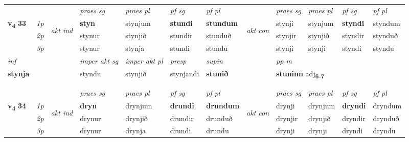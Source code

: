 \begin{longtable}[l]{X>{\footnotesize\itshape}llXXXXlXXXX}
 & &   & \textit{praes sg}  & \textit{praes pl}    & \textit{ pf sg} & \textit{pf pl} & & \textit{praes sg}  & \textit{praes pl}    & \textit{pf sg} & \textit{pf pl }  \\ \cmidrule{4-7} \cmidrule{9-12}
 \multirow{2}{*}{{{\textbf{v{\textsubscript{4}}} \Large{\textbf{33}}}}}  & 1p & \multirow{3}{*}{\begin{turn}{90}\textit{akt ind}\end{turn}} & \textbf{styn} & stynjum & \textbf{stundi} & \textbf{stundum} & \multirow{3}{*}{\begin{turn}{90}\textit{akt con}\end{turn}} &stynji & stynjum & \textbf{styndi} & styndum\\*
 & 2p &  &  stynur  & stynjið & stundir & stunduð & & stynjir & stynjið & styndir & stynduð \\*
 & 3p &  & stynur & stynja & stundi & stundu & & stynji & stynji& styndi & styndu \\*
\cmidrule{4-7} \cmidrule{9-12}

   {\textit{inf}} & &  & \textit{imper akt sg} & \textit{imper akt pl}   & \textit{presp} & \textit{supin}  && \textit{pp m} \\*
  {\textbf{stynja}} & && styndu  & stynjið   & stynjandi &  \textbf{stunið}  && \multicolumn{2}{l}{\textbf{stuninn} adj\textbf{\textsubscript{6-7}}} \\*

\midrule
   & \\*
  & \\
   \midrule
 & &   & \textit{praes sg}  & \textit{praes pl}    & \textit{ pf sg} & \textit{pf pl} & & \textit{praes sg}  & \textit{praes pl}    & \textit{pf sg} & \textit{pf pl }  \\ \cmidrule{4-7} \cmidrule{9-12}
 \multirow{2}{*}{{{\textbf{v{\textsubscript{4}}} \Large{\textbf{34}}}}}  & 1p & \multirow{3}{*}{\begin{turn}{90}\textit{akt ind}\end{turn}} & \textbf{dryn} & drynjum & \textbf{drundi} & \textbf{drundum} & \multirow{3}{*}{\begin{turn}{90}\textit{akt con}\end{turn}} &drynji & drynjum & \textbf{dryndi} & dryndum\\*
 & 2p &  &  drynur  & drynjið & drundir & drunduð & & drynjir & drynjið & dryndir & drynduð \\*
 & 3p &  & drynur & drynja & drundi & drundu & & drynji & drynji& dryndi & dryndu \\*
\cmidrule{4-7} \cmidrule{9-12}


\end{longtable}
